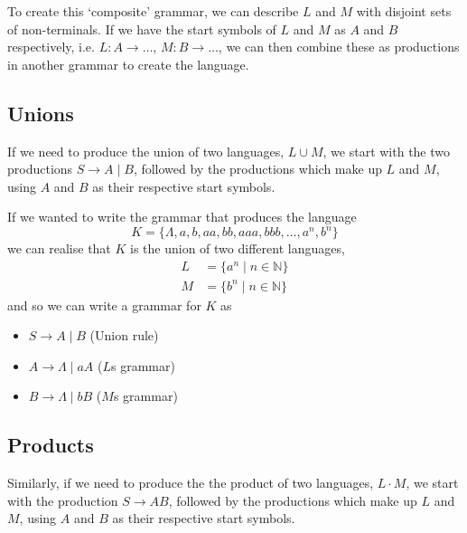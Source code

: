 To create this `composite' grammar, we can describe $L$ and $M$ with disjoint sets of non-terminals. If we have the
 start symbols of $L$ and $M$ as $A$ and $B$ respectively, i.e. $L : A \rightarrow \ldots$, $M : B \rightarrow \ldots$,
 we can then combine these as productions in another grammar to create the language.

\subsection*{Unions}

If we need to produce the union of two languages, $L \cup M$, we start with the two productions $S \rightarrow A \mid B$,
 followed by the productions which make up $L$ and $M$, using $A$ and $B$ as their respective start symbols.

\begin{example*}{}{}
  If we wanted to write the grammar that produces the language
  \begin{equation*}
    K = \{\Lambda, a, b, aa, bb, aaa, bbb, \ldots, a^n, b^n\}
  \end{equation*}
  we can realise that $K$ is the union of two different languages,
  \begin{align*}
    L &= \{a^n \mid n \in \mathbb{N}\}\\
    M &= \{b^n \mid n \in \mathbb{N}\}
  \end{align*}
  and so we can write a grammar for $K$ as
  \begin{itemize}
    \item $S \rightarrow A \mid B$ (Union rule)
    \item $A \rightarrow \Lambda \mid aA$ ($L$s grammar)
    \item $B \rightarrow \Lambda \mid bB$ ($M$s grammar)
  \end{itemize}
\end{example*}

\subsection*{Products}

Similarly, if we need to produce the the product of two languages, $L \cdot M$, we start with the production
 $S \rightarrow AB$, followed by the productions which make up $L$ and $M$, using $A$ and $B$ as their respective start
 symbols.

